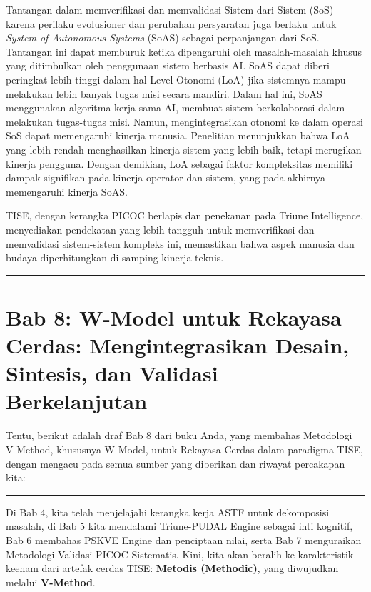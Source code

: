 \documentclass[
  letterpaper,
  DIV=11,
  numbers=noendperiod]{scrreprt}
\begin{document}
Tantangan dalam memverifikasi dan memvalidasi Sistem dari Sistem (SoS)
karena perilaku evolusioner dan perubahan persyaratan juga berlaku untuk
\emph{System of Autonomous Systems} (SoAS) sebagai perpanjangan dari
SoS. Tantangan ini dapat memburuk ketika dipengaruhi oleh
masalah-masalah khusus yang ditimbulkan oleh penggunaan sistem berbasis
AI. SoAS dapat diberi peringkat lebih tinggi dalam hal Level Otonomi
(LoA) jika sistemnya mampu melakukan lebih banyak tugas misi secara
mandiri. Dalam hal ini, SoAS menggunakan algoritma kerja sama AI,
membuat sistem berkolaborasi dalam melakukan tugas-tugas misi. Namun,
mengintegrasikan otonomi ke dalam operasi SoS dapat memengaruhi kinerja
manusia. Penelitian menunjukkan bahwa LoA yang lebih rendah menghasilkan
kinerja sistem yang lebih baik, tetapi merugikan kinerja pengguna.
Dengan demikian, LoA sebagai faktor kompleksitas memiliki dampak
signifikan pada kinerja operator dan sistem, yang pada akhirnya
memengaruhi kinerja SoAS.

TISE, dengan kerangka PICOC berlapis dan penekanan pada Triune
Intelligence, menyediakan pendekatan yang lebih tangguh untuk
memverifikasi dan memvalidasi sistem-sistem kompleks ini, memastikan
bahwa aspek manusia dan budaya diperhitungkan di samping kinerja teknis.

\begin{center}\rule{0.5\linewidth}{0.5pt}\end{center}


\chapter{\texorpdfstring{\textbf{Bab 8: W-Model untuk Rekayasa Cerdas:
Mengintegrasikan Desain, Sintesis, dan Validasi
Berkelanjutan}}{Bab 8: W-Model untuk Rekayasa Cerdas: Mengintegrasikan Desain, Sintesis, dan Validasi Berkelanjutan}}\label{bab-8-w-model-untuk-rekayasa-cerdas-mengintegrasikan-desain-sintesis-dan-validasi-berkelanjutan}

Tentu, berikut adalah draf Bab 8 dari buku Anda, yang membahas
Metodologi V-Method, khususnya W-Model, untuk Rekayasa Cerdas dalam
paradigma TISE, dengan mengacu pada semua sumber yang diberikan dan
riwayat percakapan kita:

\begin{center}\rule{0.5\linewidth}{0.5pt}\end{center}

Di Bab 4, kita telah menjelajahi kerangka kerja ASTF untuk dekomposisi
masalah, di Bab 5 kita mendalami Triune-PUDAL Engine sebagai inti
kognitif, Bab 6 membahas PSKVE Engine dan penciptaan nilai, serta Bab 7
menguraikan Metodologi Validasi PICOC Sistematis. Kini, kita akan
beralih ke karakteristik keenam dari artefak cerdas TISE:
\textbf{Metodis (Methodic)}, yang diwujudkan melalui \textbf{V-Method}.
\end{document}
